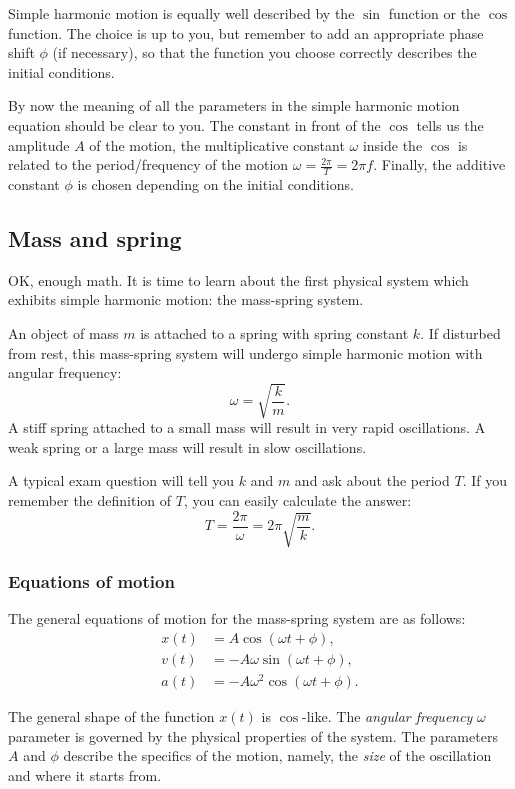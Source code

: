 \documentclass[letterpaper,9pt,journal]{IEEEtran}
\newcommand{\dokuitalic}[1]{\textsl{#1}}
\begin{document}
Simple harmonic motion is equally well described by the $\sin$ function or the $\cos$ function. 
The choice is up to you, but remember to add an appropriate phase shift $\phi$ (if necessary), 
so that the function you choose correctly describes the initial conditions.


By now the meaning of all the parameters in the simple harmonic motion equation should be clear to you.
The constant in front of the $\cos$ tells us the amplitude $A$ of the motion, 
the multiplicative constant $\omega$ inside the $\cos$ is related to the period/frequency of the motion
$\omega = \frac{2\pi}{T} = 2\pi f$. 
Finally, the additive constant $\phi$ is chosen depending on the initial conditions.


\subsection{Mass and spring}
\label{9f2186d07a8793dba3466841ad113e28}%

OK, enough math. It is time to learn about the first physical system which exhibits 
simple harmonic motion: the mass-spring system.

An object of mass $m$ is attached to a spring with spring constant $k$.
If disturbed from rest, this mass-spring system will undergo simple harmonic motion
with angular frequency:
\[
 \omega = \sqrt{ \frac{k}{m} }.
\]
A stiff spring attached to a small mass will result in very rapid oscillations.
A weak spring or a large mass will result in slow oscillations.

A typical exam question will tell you $k$ and $m$ and ask about the period $T$.
If you remember the definition of $T$, you can easily calculate the answer:
\[
 T = \frac{2\pi}{\omega} =  2\pi \sqrt{ \frac{m}{k} }.
\]


\subsubsection{Equations of motion}

The general equations of motion for the mass-spring system are as follows:
\begin{align*}
x(t) &= A\cos(\omega t + \phi), \\
v(t) &= -A\omega \sin(\omega t + \phi), \\
a(t) &= -A\omega^2\cos(\omega t + \phi).
\end{align*}

The general shape of the function $x(t)$ is $\cos$-like.
The \dokuitalic{angular frequency} $\omega$ parameter is governed by the physical properties of the system.
The parameters $A$ and $\phi$ describe the specifics of the motion, namely, 
the \dokuitalic{size} of the oscillation and where it starts from.
\end{document}
